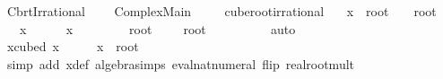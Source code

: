 %
\begin{isabellebody}%
%
%
\isadelimtheory
%
\endisadelimtheory
%
\isatagtheory
{}\isamarkupfalse%
\ Cbrt{}{}{\isacharunderscore}{\kern0pt}Irrational\ \isanewline
\ \ \ Complex{\isacharunderscore}{\kern0pt}Main\isanewline
\ \ \ \isanewline
{}%
\endisatagtheory
{\isafoldtheory}%
%
\isadelimtheory
\isanewline
%
\endisadelimtheory
\isanewline
{}\isamarkupfalse%
\ cuberoot{\isacharunderscore}{\kern0pt}irrational{\isacharcolon}{\kern0pt}\isanewline
\ \ \ {\isachardoublequoteopen}x\ {\isasymequiv}\ root\ {}\ {}\ {\isacharplus}{\kern0pt}\ root\ {}\ {}{\isachardoublequoteclose}\isanewline
\ \ \ {\isachardoublequoteopen}x\ {\isasymnotin}\ {\isasymrat}{\isachardoublequoteclose}\isanewline
%
\isadelimproof
%
\endisadelimproof
%
\isatagproof
{}\isamarkupfalse%
\isanewline
\ \ \isamarkupfalse%
\ {\isachardoublequoteopen}x\ {\isasymin}\ {\isasymrat}{\isachardoublequoteclose}\isanewline
\ \ \isamarkupfalse%
\isanewline
\ \ \isamarkupfalse%
\ {\isachardoublequoteopen}root\ {}\ {}\ {\isacharequal}{\kern0pt}\ {}{\isachardoublequoteclose}\ {\isachardoublequoteopen}root\ {}\ {}{}\ {\isacharequal}{\kern0pt}\ {}{\isachardoublequoteclose}\isanewline
\ \ \ \ \isamarkupfalse%
\ auto\isanewline
\ \ \isamarkupfalse%
\ \isamarkupfalse%
\ xcubed{\isacharcolon}{\kern0pt}\ {\isachardoublequoteopen}x{\isacharcircum}{\kern0pt}{}\ {\isacharequal}{\kern0pt}\ {}\ {\isacharplus}{\kern0pt}\ {}\ {\isacharasterisk}{\kern0pt}\ x\ {\isacharasterisk}{\kern0pt}\ root\ {}\ {}{\isachardoublequoteclose}\isanewline
\ \ \ \ \isamarkupfalse%
\ {\isacharparenleft}{\kern0pt}simp\ add{\isacharcolon}{\kern0pt}\ x{\isacharunderscore}{\kern0pt}def\ algebra{\isacharunderscore}{\kern0pt}simps\ eval{\isacharunderscore}{\kern0pt}nat{\isacharunderscore}{\kern0pt}numeral\ flip{\isacharcolon}{\kern0pt}\ real{\isacharunderscore}{\kern0pt}root{\isacharunderscore}{\kern0pt}mult{\isacharparenright}{\kern0pt}\isanewline
\ \ \isamarkupfalse%
\ \isamarkupfalse%

\end{isabellebody}
